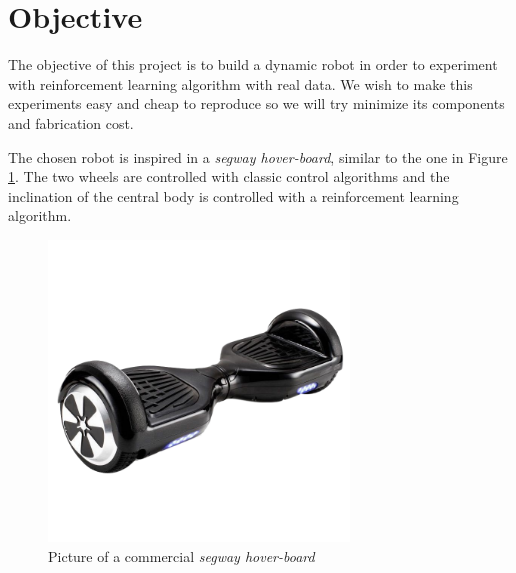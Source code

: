\section{Objective}
The objective of this project is to build a dynamic robot in order to experiment with reinforcement learning algorithm with real data. We wish to make this experiments easy and cheap to reproduce so we will try minimize its components and fabrication cost. 

The chosen robot is inspired in a \textit{segway hover-board}, similar to the one in Figure \ref{fig:Picture of a commercial segway hover-board}. The two wheels are controlled with classic control algorithms and the inclination of the central body is controlled with a reinforcement learning algorithm.

\begin{figure}
	\centering
	\includegraphics[width=8cm]{img/segway_hoverboard_picture.png}
	\caption{Picture of a commercial \textit{segway hover-board} }
	\label{fig:Picture of a commercial segway hover-board}
\end{figure}
